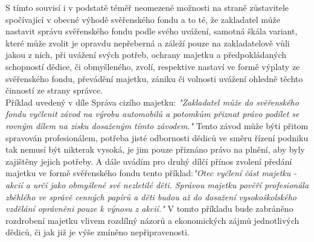 \documentclass{article}
\begin{document}
S tímto souvisí i v podstatě téměř neomezené možnosti na straně zůstavitele spočívající v obecné výhodě svěřenského fondu a to té, že zakladatel může nastavit správu svěřenského fondu podle svého uvážení, samotná škála variant, které může zvolit je opravdu nepřeberná a záleží pouze na zakladatelově vůli jakou z nich, při uvážení svých potřeb, ochrany majetku a předpokládaných schopností dědice, či obmyšleného, zvolí, respektive nastaví ve formě výplaty ze svěřenského fondu, převádění majetku, zániku či volnosti uvážení ohledně těchto činností ze strany správce.\\

 
 
 Příklad uvedený v díle Správa cizího majetku: \textit{"Zakladatel může  do svěřenského fondu vyčlenit závod na výrobu automobilů a potomkům přiznat právo podílet se rovným dílem na zisku dosaženým tímto závodem."} Tento závod může býti přitom spravován profesionálem, potřeba jisté odbornosti dědiců ve směru řízení podniku tak nemusí být nikterak vysoká, je jim pouze přiznáno právo na plnění, aby byly zajištěny jejich potřeby. A dále uvádím pro druhý dílčí přínos zvolení předání majetku ve formě svěřenského fondu tento příklad:\textit{"Otec vyčlení část majetku - akcií a určí jako obmyšlené své nezletilé děti. Správou majetku pověří profesionála zběhlého ve správě cenných papírů a děti budou až do dosažení vysokoškolského vzdělání oprávněni pouze k výnosu z akcií."} V tomto příkladu bude zabráněno rozdrobení majetku vlivem rozdílný názorů a ekonomických zájmů jednotlivých dědiců, či jak již je výše zmíněno nepřipravenosti.\\
 
 
 \newpage
 \thispagestyle{smallertextinheader}
 
\end{document}

